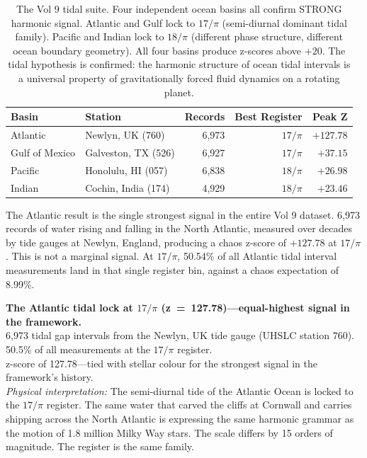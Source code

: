 \documentclass[11pt, letterpaper, openany]{book}
\begin{document}
\begin{table}[H]
\centering
\renewcommand{\arraystretch}{1.4}
\begin{tabular}{|l|l|r|r|r|}
\hline
\rowcolor{kishblue!10}
\textbf{Basin} & \textbf{Station} & \textbf{Records} & \textbf{Best Register} & \textbf{Peak Z} \\
\hline\hline
\rowcolor{tidalblue!10}
Atlantic & Newlyn, UK (760)      & 6,973 & $17/\pi$ & $+127.78$ \\
\rowcolor{tidalblue!8}
Gulf of Mexico & Galveston, TX (526) & 6,927 & $17/\pi$ & $+37.15$ \\
\rowcolor{tidalblue!6}
Pacific  & Honolulu, HI (057)    & 6,838 & $18/\pi$ & $+26.98$ \\
\rowcolor{tidalblue!5}
Indian   & Cochin, India (174)   & 4,929 & $18/\pi$ & $+23.46$ \\
\hline
\end{tabular}
\caption{The Vol 9 tidal suite. Four independent ocean basins all confirm STRONG
harmonic signal. Atlantic and Gulf lock to $17/\pi$ (semi-diurnal dominant tidal
family). Pacific and Indian lock to $18/\pi$ (different phase structure, different
ocean boundary geometry). All four basins produce z-scores above $+20$. The tidal
hypothesis is confirmed: the harmonic structure of ocean tidal intervals is a
universal property of gravitationally forced fluid dynamics on a rotating planet.}
\label{tab:v9_tidal_suite}
\end{table}

The Atlantic result is the single strongest signal in the entire Vol 9 dataset.
6,973 records of water rising and falling in the North Atlantic, measured over
decades by tide gauges at Newlyn, England, producing a chaos z-score of $+127.78$
at $17/\pi$. This is not a marginal signal. At $17/\pi$, 50.54\% of all Atlantic
tidal interval measurements land in that single register bin, against a chaos
expectation of 8.99\%.

\begin{signalbox}
\textbf{The Atlantic tidal lock at $17/\pi$ (z~=~127.78)---equal-highest
signal in the framework.}\\[0.5em]
6,973 tidal gap intervals from the Newlyn, UK tide gauge (UHSLC station 760).\\
50.5\% of all measurements at the $17/\pi$ register.\\
z-score of 127.78---tied with stellar colour for the strongest signal in the
framework's history.\\[0.5em]
\textit{Physical interpretation:} The semi-diurnal tide of the Atlantic Ocean is
locked to the $17/\pi$ register. The same water that carved the cliffs at
Cornwall and carries shipping across the North Atlantic is expressing the same
harmonic grammar as the motion of 1.8 million Milky Way stars. The scale differs
by 15 orders of magnitude. The register is the same family.
\end{signalbox}
\end{document}
